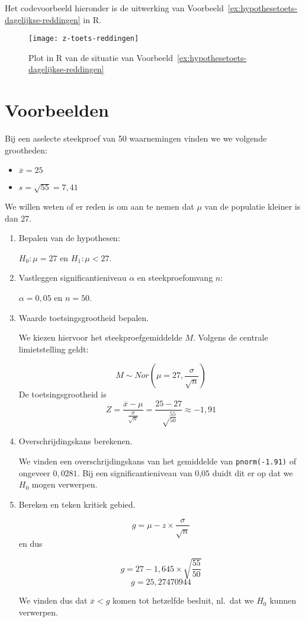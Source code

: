 Het codevoorbeeld hieronder is de uitwerking van Voorbeeld~\ref{ex:hypothesetoets-dagelijkse-reddingen} in R.



\begin{figure}
  \centering
  \texttt{[image: z-toets-reddingen]}
  \caption{Plot in R van de situatie van Voorbeeld~\ref{ex:hypothesetoets-dagelijkse-reddingen}}
\end{figure}

\section{Voorbeelden}

\begin{example}
  Bij een aselecte steekproef van 50 waarnemingen vinden we we volgende grootheden:
  \begin{itemize}
    \item $\overline{x} = 25$
    \item $s = \sqrt{55} = 7,41$
  \end{itemize}
  
  We willen weten of er reden is om aan te nemen dat $\mu$ van de populatie kleiner is dan 27.
  
  \begin{enumerate}
    \item Bepalen van de hypothesen: 
    
    $H_{0} : \mu = 27$ en $H_{1}: \mu < 27$.
    
    \item Vastleggen significantieniveau $\alpha$ en steekproefomvang $n$:
    
    $\alpha = 0,05$ en $n=50$.
    
    \item Waarde toetsingsgrootheid bepalen. 
    
    We kiezen hiervoor het steekproefgemiddelde $M$. Volgens de centrale limietstelling geldt:
    
    \[ M \sim Nor(\mu = 27, \frac{\sigma}{\sqrt{n}}) \]
    De toetsingsgrootheid is
    \[ Z = \frac{\overline{x} - \mu}{\frac{\sigma}{\sqrt{n}}} = \frac{25-27}{\sqrt\frac{55}{50}} \approx -1,91\]
    
    \item Overschrijdingskans berekenen.
    
    We vinden een overschrijdingskans van het gemiddelde van \texttt{pnorm(-1.91)} of ongeveer $0,0281$. Bij een significantieniveau van 0,05 duidt dit er op dat we $H_{0}$ mogen verwerpen.
    
    \item Bereken en teken kritiek gebied.
    
    \[ g = \mu - z \times \frac{\sigma}{\sqrt{n}} \]
    en dus
    
    \[ g = 27 - 1,645 \times \sqrt{\frac{55}{50}} \]
    \[ g =  25,27470944 \]
    
    We vinden dus dat $\overline{x} < g$ komen tot hetzelfde besluit, nl.~dat we $H_{0}$ kunnen verwerpen.
    
  \end{enumerate}
\end{example}

